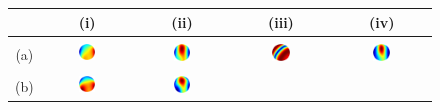 \documentclass[authoryear,preprint,12pt]{elsarticle}
\begin{document}
\begin{figure}[tbp]
  \begin{center}
    \begin{tabular}{c|cccc}
      & (i) & (ii) & (iii) & (iv)\\
      \hline
      \\
      (a) & \includegraphics[width=0.2\textwidth]{try460ny.ps} &
      \includegraphics[width=0.2\textwidth]{try160ny.ps} &
      \includegraphics[width=0.2\textwidth]{try260ny.ps} & 
      \includegraphics[width=0.2\textwidth]{try360ny.ps}\\
      \\
      (b) & \includegraphics[width=0.2\textwidth]{try490ny.ps} &
      \includegraphics[width=0.2\textwidth]{try190ny.ps} &

\end{tabular}
\end{center}
\end{figure}
\end{document}
